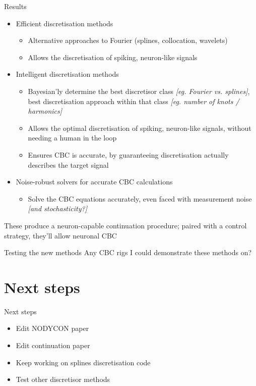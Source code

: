 \documentclass[presentation]{beamer}
\begin{document}
\begin{frame}[<+->][label={sec:org5585dd5},plain]{Results}
\begin{itemize}
\item Efficient discretisation methods
\begin{itemize}
\item Alternative approaches to Fourier (splines, collocation, wavelets)
\item Allows the discretisation of spiking, neuron-like signals
\end{itemize}
\end{itemize}
\vfill
\begin{itemize}
\item Intelligent discretisation methods
\begin{itemize}
\item Bayesian'ly determine the best discretisor class \emph{[eg. Fourier vs. splines]}, best discretisation approach within that class \emph{[eg. number of knots / harmonics]}
\item Allows the optimal discretisation of spiking, neuron-like signals, without needing a human in the loop
\item Ensures CBC is accurate, by guaranteeing discretisation actually describes the target signal
\end{itemize}
\end{itemize}
\vfill
\begin{itemize}
\item Noise-robust solvers for accurate CBC calculations
\begin{itemize}
\item Solve the CBC equations accurately, even faced with measurement noise \emph{[and stochasticity?]}
\end{itemize}
\end{itemize}
\vfill
These produce a neuron-capable continuation procedure; paired with a control strategy, they'll allow neuronal CBC
\end{frame}

\begin{frame}[label={sec:orgfc37b0f}]{Testing the new methods}
Any CBC rigs I could demonstrate these methods on?
\end{frame}

\section{Next steps}
\label{sec:org43dd424}
\begin{frame}[label={sec:org822b81d}]{Next steps}
\begin{itemize}
\item Edit NODYCON paper
\item Edit continuation paper
\item Keep working on splines discretisation code
\item Test other discretisor methods
\end{itemize}
\end{frame}
\end{document}
